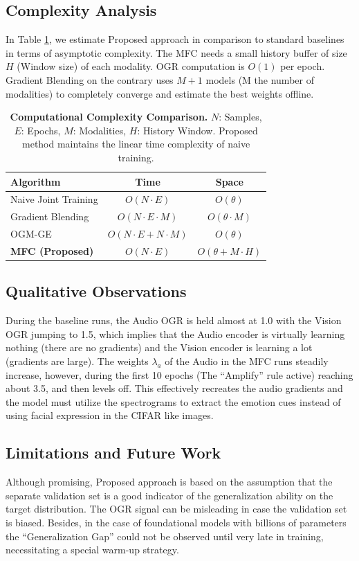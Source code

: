 \documentclass[fleqn,10pt]{wlscirep}
\begin{document}
\subsection{Complexity Analysis}
In Table \ref{tab:complexity}, we estimate Proposed approach in comparison to standard baselines in terms of asymptotic complexity. The MFC needs a small history buffer of size $H$ (Window size) of each modality. OGR computation is $O(1)$ per epoch. Gradient Blending on the contrary uses $M+1$ models (M the number of modalities) to completely converge and estimate the best weights offline.

\begin{table}[h]
\caption{\textbf{Computational Complexity Comparison.} $N$: Samples, $E$: Epochs, $M$: Modalities, $H$: History Window. Proposed method maintains the linear time complexity of naive training.}
\label{tab:complexity}
\centering
\begin{tabularx}{\columnwidth}{@{}Xcc@{}}
\toprule
\textbf{Algorithm} & \textbf{Time} & \textbf{Space} \\ \midrule
Naive Joint Training & $O(N \cdot E)$ & $O(\theta)$ \\
Gradient Blending & $O(N \cdot E \cdot M)$ & $O(\theta \cdot M)$ \\
OGM-GE & $O(N \cdot E + N \cdot M)$ & $O(\theta)$ \\
\textbf{MFC (Proposed)} & $O(N \cdot E)$ & $O(\theta + M \cdot H)$ \\ \bottomrule
\end{tabularx}
\end{table}

\subsection{Qualitative Observations}
During the baseline runs, the Audio OGR is held almost at 1.0 with the Vision OGR jumping to 1.5, which implies that the Audio encoder is virtually learning nothing (there are no gradients) and the Vision encoder is learning a lot (gradients are large). The weights $\lambda_a$ of the Audio in the MFC runs steadily increase, however, during the first 10 epochs (The ``Amplify'' rule active) reaching about 3.5, and then levels off. This effectively recreates the audio gradients and the model must utilize the spectrograms to extract the emotion cues instead of using facial expression in the CIFAR like images.

\subsection{Limitations and Future Work}
Although promising, Proposed approach is based on the assumption that the separate validation set is a good indicator of the generalization ability on the target distribution. The OGR signal can be misleading in case the validation set is biased. Besides, in the case of foundational models with billions of parameters the ``Generalization Gap'' could not be observed until very late in training, necessitating a special warm-up strategy.
\end{document}
